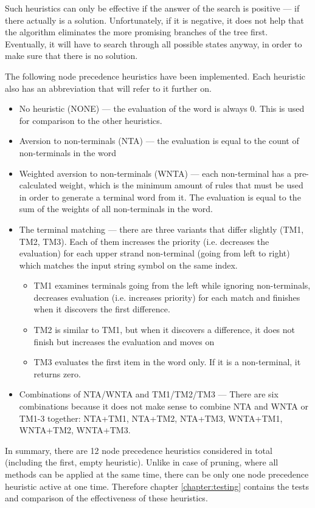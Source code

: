\begin{enumerate}
Such heuristics can only be effective if the answer of the search is positive --- if there actually is a solution. Unfortunately, if it is negative, it does not help that the algorithm eliminates the more promising branches of the tree first. Eventually, it will have to search through all possible states anyway, in order to make sure that there is no solution.

The following node precedence heuristics have been implemented. Each heuristic also has an abbreviation that will refer to it further on.

\begin{itemize}
  \item{No heuristic (NONE) --- the evaluation of the word is always 0. This is used for comparison to the other heuristics.}
  \item{Aversion to non-terminals (NTA) --- the evaluation is equal to the count of non-terminals in the word}
  \item{Weighted aversion to non-terminals (WNTA) --- each non-terminal has a pre-calculated weight, which is the minimum amount of rules that must be used in order to generate a terminal word from it. The evaluation is equal to the sum of the weights of all non-terminals in the word.}
  \item{The terminal matching --- there are three variants that differ slightly (TM1, TM2, TM3). Each of them increases the priority (i.e. decreases the evaluation) for each upper strand non-terminal (going from left to right) which matches the input string symbol on the same index.
  \begin{itemize}
    \item{TM1 examines terminals going from the left while ignoring non-terminals, decreases evaluation (i.e. increases priority) for each match and finishes when it discovers the first difference.}
    \item{TM2 is similar to TM1, but when it discovers a difference, it does not finish but increases the evaluation and moves on}
    \item{TM3 evaluates the first item in the word only. If it is a non-terminal, it returns zero.}
  \end{itemize}
  }
  \item{Combinations of NTA/WNTA and TM1/TM2/TM3 --- There are six combinations because it does not make sense to combine NTA and WNTA or TM1-3 together: NTA+TM1, NTA+TM2, NTA+TM3, WNTA+TM1, WNTA+TM2, WNTA+TM3.}
\end{itemize}

In summary, there are 12 node precedence heuristics considered in total (including the first, empty heuristic). Unlike in case of pruning, where all methods can be applied at the same time, there can be only one node precedence heuristic active at one time. Therefore chapter \ref{chapter:testing} contains the tests and comparison of the effectiveness of these heuristics.
\end{enumerate}

